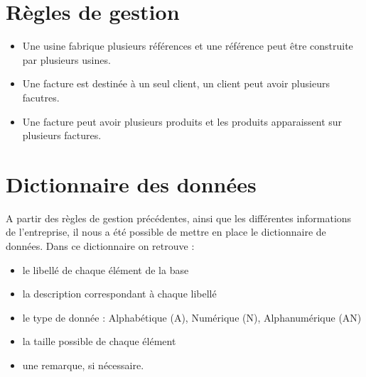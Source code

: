 \documentclass[french]{article}
\begin{document}
\newpage

\tableofcontents

\newpage

\section{Règles de gestion}
\begin{itemize}
    \item Une usine fabrique plusieurs références et une référence peut être construite par plusieurs usines.
    \item Une facture est destinée à un seul client, un client peut avoir plusieurs facutres.
    \item Une facture peut avoir plusieurs produits et les produits apparaissent sur plusieurs factures.

\end{itemize}

\section{Dictionnaire des données}

A partir des règles de gestion précédentes, ainsi que les différentes informations de l'entreprise, il nous a été possible de mettre en place le dictionnaire de données. Dans ce dictionnaire on retrouve :
\begin{itemize}
    \item le libellé de chaque élément de la base
    \item la description correspondant à chaque libellé
    \item le type de donnée : Alphabétique (A), Numérique (N), Alphanumérique (AN)
    \item la taille possible de chaque élément
    \item une remarque, si nécessaire.
\end{itemize}
\end{document}
